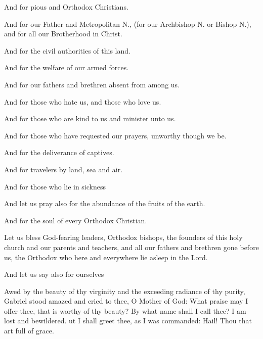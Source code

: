 \documentclass[twoside, letterpaper, 12pt]{report}
\begin{document}
\begin{priest}
  \item And for pious and Orthodox Christians.
  \item And for our Father and Metropolitan N.,
    (for our Archbishop N. or Bishop N.), and for all our Brotherhood in Christ.
  \item And for the civil authorities of this land.
  \item And for the welfare of our armed forces.
  \item And for our fathers and brethren absent from among us.
  \item And for those who hate us, and those who love us.
  \item And for those who are kind to us and minister unto us.
  \item And for those who have requested our prayers, unworthy though we be.
  \item And for the deliverance of captives.
  \item And for travelers by land, sea and air.
  \item And for those who lie in sickness
  \item And let us pray also for the abundance of the fruits of the earth.
  \item And for the soul of every Orthodox Christian.
  \item Let us bless God-fearing leaders, Orthodox bishops,
    the founders of this holy church and our parents and teachers,
    and all our fathers and brethren gone before us,
    the Orthodox who here and everywhere lie asleep in the Lord.
  \item And let us say also for ourselves
\end{priest}




Awed by the beauty of thy virginity and the exceeding radiance of thy purity,
Gabriel stood amazed and cried to thee, O Mother of God:
What praise may I offer thee, that is worthy of thy beauty?
By what name shall I call thee? I am lost and bewildered. 
ut I shall greet thee, as I was commanded:
Hail! Thou that art full of grace.


\end{document}

